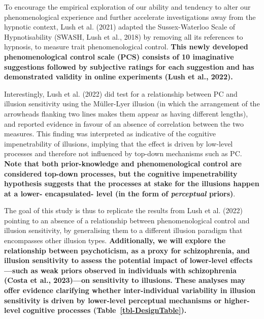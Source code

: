 \documentclass[
  man,
  floatsintext,
  longtable,
  nolmodern,
  notxfonts,
  notimes,
  colorlinks=true,linkcolor=blue,citecolor=blue,urlcolor=blue]{apa7}
\begin{document}
To encourage the empirical exploration of our ability and tendency to
alter our phenomenological experience and further accelerate
investigations away from the hypnotic context, Lush et al. (2021)
adapted the Sussex-Waterloo Scale of Hypnotisability (SWASH, Lush et
al., 2018) by removing all its references to hypnosis, to measure trait
phenomenological control. \textbf{This newly developed phenomenological
control scale (PCS) consists of 10 imaginative suggestions followed by
subjective ratings for each suggestion and has demonstrated validity in
online experiments (Lush et al., 2022).}

Interestingly, Lush et al. (2022) did test for a relationship between PC
and illusion sensitivity using the Müller-Lyer illusion (in which the
arrangement of the arrowheads flanking two lines makes them appear as
having different lengths), and reported evidence in favour of an absence
of correlation between the two measures. This finding was interpreted as
indicative of the cognitive impenetrability of illusions, implying that
the effect is driven by low-level processes and therefore not influenced
by top-down mechanisms such as PC. \textbf{Note that both
prior-knowledge and phenomenological control are considered top-down
processes, but the cognitive impenetrability hypothesis suggests that
the processes at stake for the illusions happen at a lower-
encapsulated- level (in the form of \emph{perceptual} priors)}.

The goal of this study is thus to replicate the results from Lush et al.
(2022) pointing to an absence of a relationship between phenomenological
control and illusion sensitivity, by generalising them to a different
illusion paradigm that encompasses other illusion types.
\textbf{Additionally, we will explore the relationship between
psychoticism, as a proxy for schizophrenia, and illusion sensitivity to
assess the potential impact of lower-level effects---such as weak priors
observed in individuals with schizophrenia (Costa et al., 2023)---on
sensitivity to illusions.} \textbf{These analyses may offer evidence
clarifying whether inter-individual variability in illusion sensitivity
is driven by lower-level perceptual mechanisms or higher-level cognitive
processes (Table~\ref{tbl-DesignTable}).}
\end{document}
